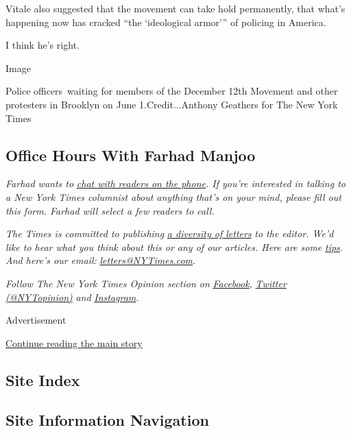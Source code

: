 Vitale also suggested that the movement can take hold permanently, that
what's happening now has cracked ``the `ideological armor''' of policing
in America.

I think he's right.

Image

Police officers~waiting for members of the December 12th Movement and
other protesters in Brooklyn on June 1.Credit...Anthony Geathers for The
New York Times

\hypertarget{office-hours-with-farhad-manjoo}{%
\subsection{Office Hours With Farhad
Manjoo}\label{office-hours-with-farhad-manjoo}}

\emph{Farhad wants to}
\href{https://www.nytimes3xbfgragh.onion/2019/05/16/opinion/farhad-office-hours.html?module=inline}{\emph{chat
with readers on the phone}}\emph{. If you're interested in talking to a
New York Times columnist about anything that's on your mind, please fill
out this form. Farhad will select a few readers to call.}

\emph{The Times is committed to publishing}
\href{https://www.nytimes3xbfgragh.onion/2019/01/31/opinion/letters/letters-to-editor-new-york-times-women.html}{\emph{a
diversity of letters}} \emph{to the editor. We'd like to hear what you
think about this or any of our articles. Here are some}
\href{https://help.nytimes3xbfgragh.onion/hc/en-us/articles/115014925288-How-to-submit-a-letter-to-the-editor}{\emph{tips}}\emph{.
And here's our email:}
\href{mailto:letters@NYTimes.com}{\emph{letters@NYTimes.com}}\emph{.}

\emph{Follow The New York Times Opinion section on}
\href{https://www.facebookcorewwwi.onion/nytopinion}{\emph{Facebook}}\emph{,}
\href{http://twitter.com/NYTOpinion}{\emph{Twitter (@NYTopinion)}}
\emph{and}
\href{https://www.instagram.com/nytopinion/}{\emph{Instagram}}\emph{.}

Advertisement

\protect\hyperlink{after-bottom}{Continue reading the main story}

\hypertarget{site-index}{%
\subsection{Site Index}\label{site-index}}

\hypertarget{site-information-navigation}{%
\subsection{Site Information
Navigation}\label{site-information-navigation}}

